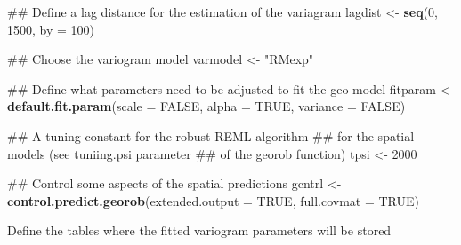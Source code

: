 \documentclass[]{book}
\newenvironment{Shaded}{\begin{snugshade}}{\end{snugshade}}
\newcommand{\DataTypeTok}[1]{\textcolor[rgb]{0.13,0.29,0.53}{#1}}
\newcommand{\DecValTok}[1]{\textcolor[rgb]{0.00,0.00,0.81}{#1}}
\newcommand{\KeywordTok}[1]{\textcolor[rgb]{0.13,0.29,0.53}{\textbf{#1}}}
\newcommand{\NormalTok}[1]{#1}
\newcommand{\OtherTok}[1]{\textcolor[rgb]{0.56,0.35,0.01}{#1}}
\newcommand{\StringTok}[1]{\textcolor[rgb]{0.31,0.60,0.02}{#1}}
\begin{document}
\begin{Shaded}
\begin{Highlighting}[]
\NormalTok{## Define a lag distance for the estimation of the variagram}
\NormalTok{lagdist <-}\StringTok{ }\KeywordTok{seq}\NormalTok{(}\DecValTok{0}\NormalTok{, }\DecValTok{1500}\NormalTok{, }\DataTypeTok{by =} \DecValTok{100}\NormalTok{)}

\NormalTok{## Choose the variogram model}
\NormalTok{varmodel <-}\StringTok{ "RMexp"}

\NormalTok{## Define what parameters need to be adjusted to fit the geo model}
\NormalTok{fitparam <-}\StringTok{ }\KeywordTok{default.fit.param}\NormalTok{(}\DataTypeTok{scale =} \OtherTok{FALSE}\NormalTok{, }\DataTypeTok{alpha =} \OtherTok{TRUE}\NormalTok{, }\DataTypeTok{variance =} \OtherTok{FALSE}\NormalTok{)}

\NormalTok{## A tuning constant for the robust REML algorithm }
\NormalTok{## for the spatial models (see tuniing.psi parameter }
\NormalTok{## of the  georob function)}
\NormalTok{tpsi <-}\StringTok{ }\DecValTok{2000}

\NormalTok{## Control some aspects of the spatial predictions}
\NormalTok{gcntrl <-}\StringTok{ }\KeywordTok{control.predict.georob}\NormalTok{(}\DataTypeTok{extended.output =} \OtherTok{TRUE}\NormalTok{, }
                                 \DataTypeTok{full.covmat =} \OtherTok{TRUE}\NormalTok{)}
\end{Highlighting}
\end{Shaded}

Define the tables where the fitted variogram parameters will be stored
\end{document}
